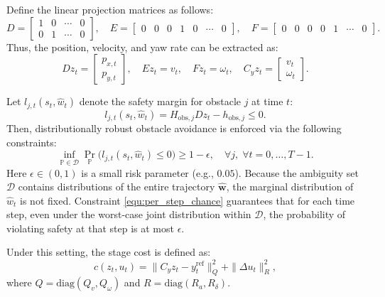 \documentclass[pdflatex,sn-mathphys,Numbered]{sn-jnl}
\numberwithin{equation}{section}
\begin{document}
Define the linear projection matrices as follows:
\begin{equation}
D = \begin{bmatrix} 1 & 0 & \cdots & 0 \\ 0 & 1 & \cdots & 0 \end{bmatrix}, \quad 
E = \begin{bmatrix} 0 & 0 & 0 & 1 & 0 & \cdots & 0 \end{bmatrix}, \quad 
F = \begin{bmatrix} 0 & 0 & 0 & 0 & 1 & \cdots & 0 \end{bmatrix}. \label{equ:projection_matrices}
\end{equation}
Thus, the position, velocity, and yaw rate can be extracted as:
\begin{equation}
D z_t = \begin{bmatrix} p_{x,t} \\ p_{y,t} \end{bmatrix}, \quad E z_t = v_t, \quad F z_t = \omega_t, \quad C_y z_t = \begin{bmatrix} v_t \\ \omega_t \end{bmatrix}. \label{equ:state_extraction}
\end{equation}

Let $l_{j,t}(s_t, \hat{w}_t)$ denote the safety margin for obstacle $j$ at time $t$:
\begin{equation}
l_{j,t}(s_t, \hat{w}_t) = H_{\text{obs},j} D z_t - h_{\text{obs},j} \leq 0. \label{equ:safety_margin}
\end{equation}
Then, distributionally robust obstacle avoidance is enforced via the following constraints:
\begin{equation}
\inf_{\mathbb{P} \in \mathcal{D}} \Pr_{\mathbb{P}}\bigl( l_{j,t}(s_t, \hat{w}_t) \le 0 \bigr) \ge 1 - \epsilon, \quad \forall j,\; \forall t = 0,\dots,T-1. \label{equ:per_step_chance}
\end{equation}
Here $\epsilon \in (0,1)$ is a small risk parameter (e.g., $0.05$). Because the ambiguity set $\mathcal{D}$ contains distributions of the entire trajectory $\hat{\mathbf{w}}$, the marginal distribution of $\hat{w}_t$ is not fixed. Constraint \eqref{equ:per_step_chance} guarantees that for each time step, even under the worst-case joint distribution within $\mathcal{D}$, the probability of violating safety at that step is at most $\epsilon$.

Under this setting, the stage cost is defined as:
\begin{equation}
c(z_t, u_t) = \| C_y z_t - y_t^{\text{ref}} \|_Q^2 + \|\Delta u_t\|_R^2, \label{equ:stage_cost}
\end{equation}
where $Q = \text{diag}(Q_v, Q_\omega)$ and $R = \text{diag}(R_a, R_\delta)$.
\end{document}
